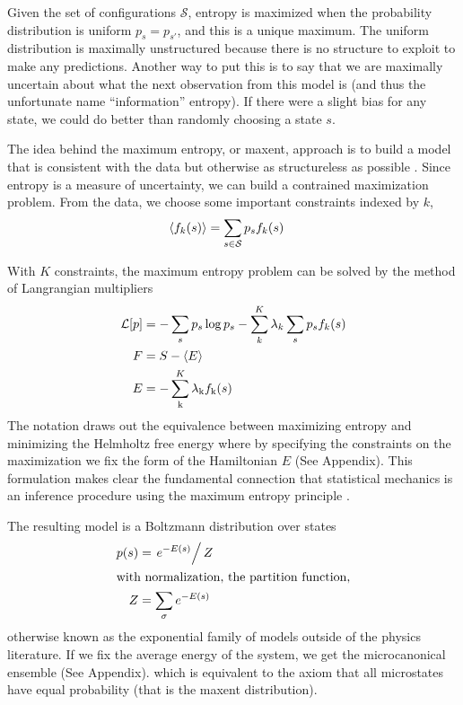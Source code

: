 \documentclass[aps,prl,twocolumn]{revtex4-1}
\begin{document}
Given the set of configurations $\mathcal{S}$, entropy is maximized when the probability distribution is uniform $p_s = p_{s'}$, and this is a unique maximum. The uniform distribution is maximally unstructured because there is no structure to exploit to make any predictions. Another way to put this is to say that we are maximally uncertain about what the next observation from this model is (and thus the unfortunate name ``information'' entropy). If there were a slight bias for any state, we could do better than randomly choosing a state $s$.

The idea behind the maximum entropy, or maxent, approach is to build a model that is consistent with the data but otherwise as structureless as possible \cite{Bretthorst:2003ua,Jaynes:1957fy}.
Since entropy is a measure of uncertainty, we can build a contrained maximization problem. From the data, we choose some important constraints indexed by $k$,
\begin{align}
	\left<f_k(s)\right> &= \sum_{s\in \mathcal{S}} p_s f_k(s)
\end{align}

With $K$ constraints, the maximum entropy problem can be solved by the method of Langrangian multipliers
\begin{align}
	\mathcal{L}[p] &= -\sum_s p_s\log p_s - \sum_k^K \lambda_k \sum_s p_s f_k(s)\\
	F &= S - \left<E\right>\\
	E &= -\sum_{\rm k}^K\lambda_{\rm k}f_{\rm k}(s)
\end{align}
The notation draws out the equivalence between maximizing entropy and minimizing the Helmholtz free energy where by specifying the constraints on the maximization we fix the form of the Hamiltonian $E$ (See Appendix). This formulation makes clear the fundamental connection that statistical mechanics is an inference procedure using the maximum entropy principle \cite{Jaynes:1957fy}.

The resulting model is a Boltzmann distribution over states
\begin{align}
	p(s) &= \left.e^{-E(s)}\right/Z\\
\intertext{with normalization, the partition function,}
	Z &= \sum_\sigma e^{-E(s)}
\end{align}
otherwise known as the exponential family of models outside of the physics literature. If we fix the average energy of the system, we get the microcanonical ensemble (See Appendix). which is equivalent to the axiom that all microstates have equal probability (that is the maxent distribution).
\end{document}
